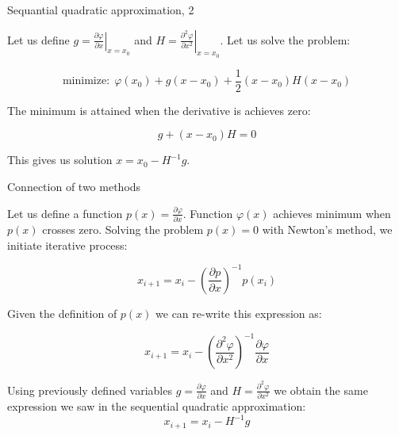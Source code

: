 \documentclass{beamer}
\begin{document}
\begin{frame}{Sequantial quadratic approximation, 2}
	\begin{flushleft}
		
		Let us define $g =\left. \frac{\partial \varphi}{\partial x} \right \vert_{x = x_0}$ and $H = \left. \frac{\partial^2 \varphi}{\partial x^2}\right \vert_{x = x_0}$. Let us solve the problem:
		
		\begin{equation}
			\text{minimize:} \ \ \varphi(x_0) + g (x - x_0)
			+  \frac{1}{2}  (x - x_0) H (x - x_0)
		\end{equation}
		
		The minimum is attained when the derivative is achieves zero:
		
		\begin{equation}
			g + (x - x_0) H = 0
		\end{equation}
		
		This gives us solution $x = x_0 - H^{-1} g$.
		
	\end{flushleft}
\end{frame}





\begin{frame}{Connection of two methods}
	\begin{flushleft}
		
		Let us define a function $p(x) = \frac{\partial \varphi}{\partial x}$. Function $\varphi (x)$ achieves minimum when $p(x)$ crosses zero. Solving the problem $p(x) = 0$ with Newton's method, we initiate iterative process:
		
		\begin{equation}
			x_{i+1} = x_i  - \left ( \frac{\partial p}{\partial x} \right )^{-1} p(x_i)
		\end{equation}
		
		Given the definition of $p(x)$ we can re-write this expression as:
		
		\begin{equation}
			x_{i+1} = x_i  - \left ( \frac{\partial^2 \varphi}{\partial x^2} \right )^{-1} \frac{\partial \varphi}{\partial x}
		\end{equation}
		
		Using previously defined variables $g =\frac{\partial \varphi}{\partial x}$ and $H = \frac{\partial^2 \varphi}{\partial x^2}$ we obtain the same expression we saw in the sequential quadratic approximation:
		\begin{equation}
			x_{i+1} = x_i  - H^{-1} g
		\end{equation}

	\end{flushleft}
\end{frame}
\end{document}

